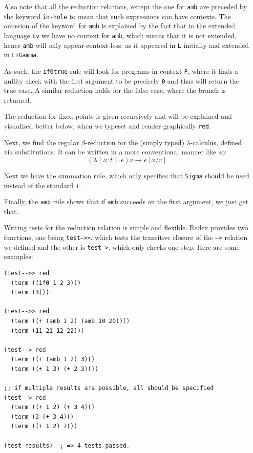 Also note that all the reduction relations, except the one for \texttt{amb}
are preceded by the keyword \texttt{in-hole} to mean that such expressions
can have contexts. The omission of the keyword for \texttt{amb} is explained
by the fact that in the extended language \texttt{Ev} we have no context for
\texttt{amb}, which means that it is not extended, hence \texttt{amb} will
only appear context-less, as it appeared in \texttt{L} initially and
extended in \texttt{L+Gamma}.

As such, the \texttt{if0true} rule will look for programs in context \texttt{P},
where it finds a nullity check with the first argument to be precisely \texttt{0}
and thus will return the true case. A similar reduction holds for the false
case, where the  branch is returned.

The reduction for fixed points is given recursively and will be explained
and visualized better below, when we typeset and render graphically \texttt{red}.

Next, we find the regular $ \beta $-reduction for the (simply typed)
$ \lambda $-calculus, defined via substitutions. It can be written in a
more conventional manner like so:
\[
  (\lambda (x : t).e)v \to e[x/v]
\]

Next we have the summation rule, which only specifies that \texttt{Sigma}
should be used instead of the standard \texttt{+}.

Finally, the \texttt{amb} rule shows that if \texttt{amb} succeeds on the
first argument, we just get that.

\vspace{0.3cm}

Writing tests for the reduction relation is simple and flexible. Redex
provides two functions, one being \texttt{test-->>}, which tests the
transitive closure of the \texttt{-->} relation we defined and the other
is \texttt{test-->}, which only checks one step. Here are some examples:

\newpage
{
  \small
\begin{verbatim}
(test-->> red
  (term ((if0 1 2 3)))
  (term (3)))

(test-->> red
  (term ((+ (amb 1 2) (amb 10 20))))
  (term (11 21 12 22)))

(test--> red
  (term ((+ (amb 1 2) 3)))
  (term ((+ 1 3) (+ 2 3))))

;; if multiple results are possible, all should be specified
(test--> red
  (term ((+ 1 2) (+ 3 4)))
  (term (3 (+ 3 4)))
  (term ((+ 1 2) 7)))

(test-results)  ; => 4 tests passed.
\end{verbatim}
}

